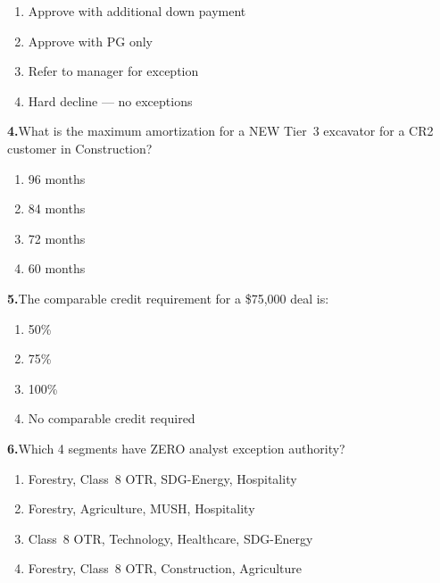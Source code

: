 \documentclass[11pt,letterpaper]{article}
\newif\ifshowsolutions
\newcommand{\answer}[1]{%
  \ifshowsolutions
    \begin{tcolorbox}[colback=green!5!white, colframe=answergreen, title={\small\textbf{Answer}}, fonttitle=\color{white}, coltitle=white, colbacktitle=answergreen, boxrule=0.5pt, arc=2pt, left=4pt, right=4pt, top=2pt, bottom=2pt]
    {\small #1}
    \end{tcolorbox}
  \fi
}
\begin{document}
\begin{enumerate}[label=\Alph*), leftmargin=2em, itemsep=0pt]
\item Approve with additional down payment
\item Approve with PG only
\item Refer to manager for exception
\item Hard decline --- no exceptions
\end{enumerate}
\answer{D) Hard decline --- no exceptions. First-time owner/operators are NEVER financed in Class~8.}

\vspace{0.5em}

\noindent\textbf{4.}\quad What is the maximum amortization for a NEW Tier~3 excavator for a CR2 customer in Construction?

\begin{enumerate}[label=\Alph*), leftmargin=2em, itemsep=0pt]
\item 96 months
\item 84 months
\item 72 months
\item 60 months
\end{enumerate}
\answer{B) 84 months. Tier~1/2 new = 96 months, Tier~3 = 12 months less = 84 months.}

\vspace{0.5em}

\noindent\textbf{5.}\quad The comparable credit requirement for a \$75,000 deal is:

\begin{enumerate}[label=\Alph*), leftmargin=2em, itemsep=0pt]
\item 50\%
\item 75\%
\item 100\%
\item No comparable credit required
\end{enumerate}
\answer{B) 75\%. Thresholds: $<$\$50K = 50\%, $<$\$100K = 75\%, $\geq$\$100K = 100\%.}

\vspace{0.5em}

\noindent\textbf{6.}\quad Which 4 segments have ZERO analyst exception authority?

\begin{enumerate}[label=\Alph*), leftmargin=2em, itemsep=0pt]
\item Forestry, Class~8 OTR, SDG-Energy, Hospitality
\item Forestry, Agriculture, MUSH, Hospitality
\item Class~8 OTR, Technology, Healthcare, SDG-Energy
\item Forestry, Class~8 OTR, Construction, Agriculture
\end{enumerate}
\answer{A) Forestry, Class~8 OTR, SDG-Energy, and Hospitality. All require Next Level Approval Authority.}
\end{document}
